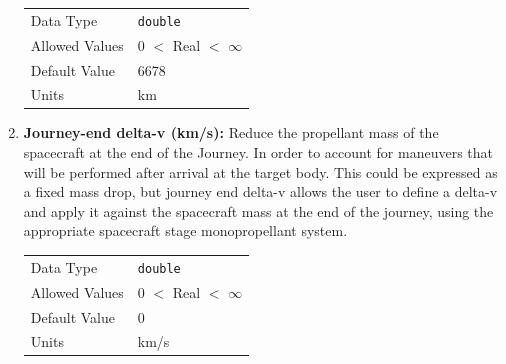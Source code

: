 \begin{enumerate}
        \begin{table}[H]
            \hspace{2cm}
            \begin{tabular}{ll}
            Data Type & \verb|double| \\
            Allowed Values & 0 $<$ Real $<$ $\infty$ \\
            Default Value & 6678\\
            Units & km
            \end{tabular}
        \end{table}
    \item \textbf{Journey-end delta-v (km/s):} Reduce the propellant mass of the spacecraft at the end of the Journey. In order to account for maneuvers that will be performed after arrival at the target body. This could be expressed as a fixed mass drop, but journey end delta-v allows the user to define a delta-v and apply it against the spacecraft mass at the end of the journey, using the appropriate spacecraft stage monopropellant system.
        
        \begin{table}[H]
            \hspace{2cm}
            \begin{tabular}{ll}
            Data Type & \verb|double| \\
            Allowed Values & 0 $<$ Real $<$ $\infty$ \\
            Default Value & 0 \\
            Units & km/s 
            \end{tabular}
        \end{table}

    \end{enumerate}

